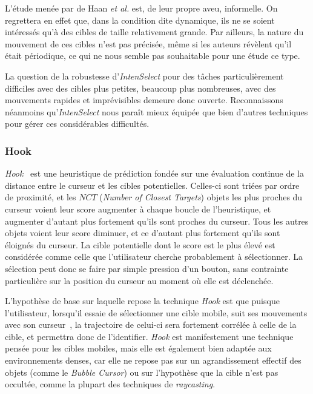 	L'étude menée par de Haan \emph{et al.} est, de leur propre aveu, informelle. On regrettera en effet que, dans la condition dite dynamique, ils ne se soient intéressés qu'à des cibles de taille relativement grande. Par ailleurs, la nature du mouvement de ces cibles n'est pas précisée, même si les auteurs révèlent qu'il était périodique, ce qui ne nous semble pas souhaitable pour une étude ce type.
	
	La question de la robustesse d'\emph{IntenSelect} pour des tâches particulièrement difficiles avec des cibles plus petites, beaucoup plus nombreuses, avec des mouvements rapides et imprévisibles demeure donc ouverte. Reconnaissons néanmoins qu'\emph{IntenSelect} nous paraît mieux équipée que bien d'autres techniques pour gérer ces considérables difficultés.
		
	\subsubsection{Hook}
	\label{sub:hook}
	\emph{Hook}~\cite{ortega2013hook} est une heuristique de prédiction fondée sur une évaluation continue de la distance entre le curseur et les cibles potentielles. Celles-ci sont triées par ordre de proximité, et les $NCT$ (\emph{Number of Closest Targets}) objets les plus proches du curseur voient leur score augmenter à chaque boucle de l'heuristique, et augmenter d'autant plus fortement qu'ils sont proches du curseur. Tous les autres objets voient leur score diminuer, et ce d'autant plus fortement qu'ils sont éloignés du curseur. La cible potentielle dont le score est le plus élevé est considérée comme celle que l'utilisateur cherche probablement à sélectionner. La sélection peut donc se faire par simple pression d'un bouton, sans contrainte particulière sur la position du curseur au moment où elle est déclenchée.

	L'hypothèse de base sur laquelle repose la technique \emph{Hook} est que puisque l'utilisateur, lorsqu'il essaie de sélectionner une cible mobile, \og suit \fg{} ses mouvements avec son curseur~\cite{hasan2011comet}, la trajectoire de celui-ci sera fortement corrélée à celle de la cible, et permettra donc de l'identifier. \emph{Hook} est manifestement une technique pensée pour les cibles mobiles, mais elle est également bien adaptée aux environnements denses, car elle ne repose pas sur un agrandissement effectif des objets (comme le \emph{Bubble Cursor}) ou sur l'hypothèse que la cible n'est pas occultée, comme la plupart des techniques de \emph{raycasting}.
	
